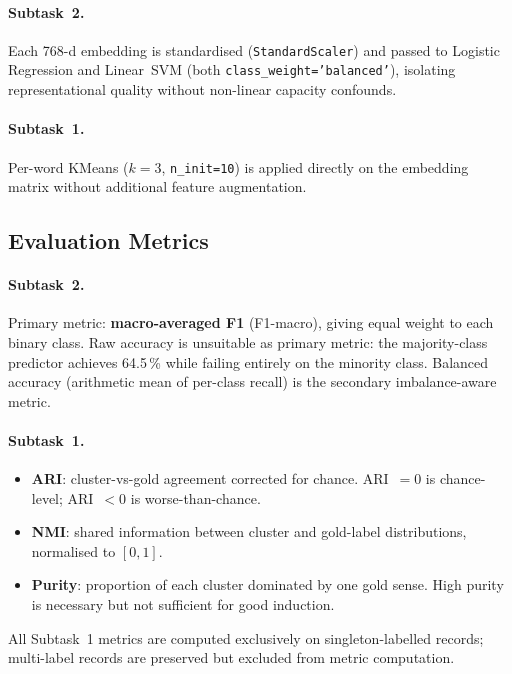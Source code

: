 \paragraph{Subtask~2.}
Each 768-d embedding is standardised (\texttt{StandardScaler}) and passed to
Logistic Regression and Linear~SVM (both \texttt{class\_weight='balanced'}),
isolating representational quality without non-linear capacity confounds.

\paragraph{Subtask~1.}
Per-word KMeans ($k=3$, \texttt{n\_init=10}) is applied directly on the
embedding matrix without additional feature augmentation.


\subsection{Evaluation Metrics}

\paragraph{Subtask~2.}
Primary metric: \textbf{macro-averaged F1} (F1-macro), giving equal weight
to each binary class.  Raw accuracy is unsuitable as primary metric: the
majority-class predictor achieves 64.5\,\% while failing entirely on the
minority class.  Balanced accuracy (arithmetic mean of per-class recall)
is the secondary imbalance-aware metric.

\paragraph{Subtask~1.}
\begin{itemize}
  \item \textbf{ARI}: cluster-vs-gold agreement corrected for chance.
    ARI~$=0$ is chance-level; ARI~$<0$ is worse-than-chance.
  \item \textbf{NMI}: shared information between cluster and gold-label
    distributions, normalised to $[0,1]$.
  \item \textbf{Purity}: proportion of each cluster dominated by one gold
    sense.  High purity is necessary but not sufficient for good induction.
\end{itemize}
All Subtask~1 metrics are computed exclusively on singleton-labelled records;
multi-label records are preserved but excluded from metric computation.


